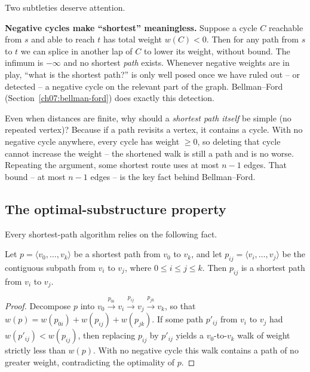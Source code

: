Two subtleties deserve attention.

\begin{trapbox}
\textbf{Negative cycles make ``shortest'' meaningless.} Suppose a cycle $C$ reachable from
$s$ and able to reach $t$ has total weight $w(C)<0$. Then for any path from $s$ to $t$ we
can splice in another lap of $C$ to lower its weight, without bound. The infimum is
$-\infty$ and no shortest \emph{path} exists. Whenever negative weights are in play, ``what
is the shortest path?'' is only well posed once we have ruled out -- or detected -- a
negative cycle on the relevant part of the graph. Bellman--Ford
(Section~\ref{ch07:bellman-ford}) does exactly this detection.
\end{trapbox}

\begin{intuitionbox}
Even when distances are finite, why should a \emph{shortest path itself} be simple (no
repeated vertex)? Because if a path revisits a vertex, it contains a cycle. With no
negative cycle anywhere, every cycle has weight $\ge 0$, so deleting that cycle cannot
increase the weight -- the shortened walk is still a path and is no worse. Repeating the
argument, some shortest route uses at most $n-1$ edges. That bound -- at most $n-1$
edges -- is the key fact behind Bellman--Ford.
\end{intuitionbox}

\subsection{The optimal-substructure property}

Every shortest-path algorithm relies on the following fact.

\begin{lemma}
\label{ch07:optsub}
Let $p=\langle v_0,\dots,v_k\rangle$ be a shortest path from $v_0$ to $v_k$, and let
$p_{ij}=\langle v_i,\dots,v_j\rangle$ be the contiguous subpath from $v_i$ to $v_j$, where
$0\le i\le j\le k$. Then $p_{ij}$ is a shortest path from $v_i$ to $v_j$.
\end{lemma}

\begin{proof}
Decompose $p$ into $v_0 \xrightarrow{p_{0i}} v_i \xrightarrow{p_{ij}} v_j
\xrightarrow{p_{jk}} v_k$, so that $w(p)=w(p_{0i})+w(p_{ij})+w(p_{jk})$. If some path
$p'_{ij}$ from $v_i$ to $v_j$ had $w(p'_{ij})<w(p_{ij})$, then replacing $p_{ij}$ by
$p'_{ij}$ yields a $v_0$-to-$v_k$ walk of weight strictly less than $w(p)$. With no
negative cycle this walk contains a path of no greater weight, contradicting the
optimality of $p$.
\end{proof}

